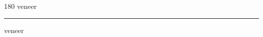 
\begin{frame}
\begin{center}
\begin{turn}{180}
{\fontsize{2.5cm}{1em}\selectfont veneer}
\end{turn}
\vspace{1em}\par  
\hrule
\vspace{1em}\par  
{\fontsize{2.5cm}{1em}\selectfont veneer}
\end{center}
\end{frame}
